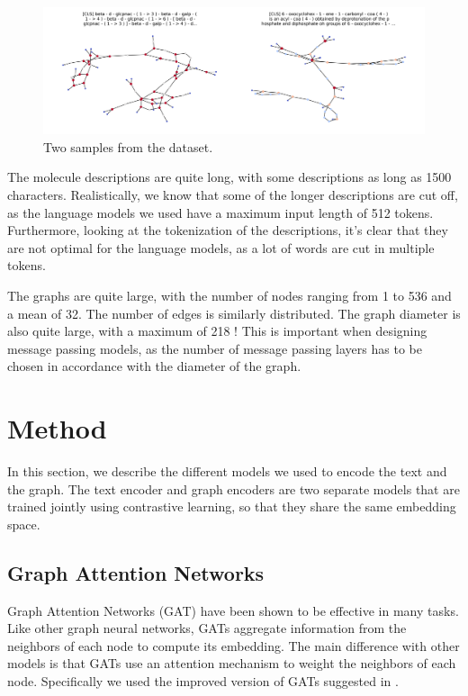 \documentclass[switch, 11pt]{article}
\begin{document}
\begin{multicols}{2}
    \begin{figure}[H]
        \centering
        \includegraphics[width=\columnwidth]{figures/graphs.png}
        \caption{Two samples from the dataset.}
        \label{fig:dataset}
    \end{figure}

    The molecule descriptions are quite long, with some descriptions as long as 1500 characters. Realistically, we know that some of the longer descriptions are cut off, as the language models we used have a maximum input length of 512 tokens. Furthermore, looking at the tokenization of the descriptions, it's clear that they are not optimal for the language models, as a lot of words are cut in multiple tokens.

    The graphs are quite large, with the number of nodes ranging from 1 to 536 and a mean of 32. The number of edges is similarly distributed. The graph diameter is also quite large, with a maximum of 218 ! This is important when designing message passing models, as the number of message passing layers has to be chosen in accordance with the diameter of the graph.

    \section{Method}

    In this section, we describe the different models we used to encode the text and the graph. The text encoder and graph encoders are two separate models that are trained jointly using contrastive learning, so that they share the same embedding space.

    \subsection{Graph Attention Networks}

    Graph Attention Networks (GAT) \cite{velickovic-2018} have been shown to be effective in many tasks. Like other graph neural networks, GATs aggregate information from the neighbors of each node to compute its embedding. The main difference with other models is that GATs use an attention mechanism to weight the neighbors of each node. Specifically we used the improved version of GATs suggested in \cite{brody-2021}.


\end{multicols}
\end{document}
